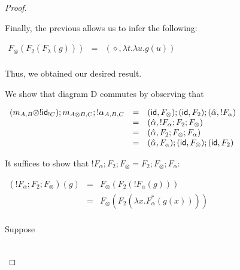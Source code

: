 \begin{proof}
\begin{report}
\begin{center}
\begin{itemize}
\begin{center}
      \end{center}
      Finally, the previous allows us to infer the following:
      \begin{center}
        \begin{math}
          \begin{array}{lll}
            F_\otimes(F_2(F_\lambda(g)))
            & = & (\diamond, \lambda t.\lambda u.g(u))\\
          \end{array}
        \end{math}
      \end{center}
      Thus, we obtained our desired result.

      \noindent
      We show that diagram D commutes by observing that
      \begin{center}
        \begin{math}
          \begin{array}{lll}
            (m_{A,B} \otimes !\mathsf{id}_{!C});m_{A\otimes B,C};!\alpha_{A,B,C}
            & = & (\mathsf{id},F_\otimes);(\mathsf{id},F_2);(\hat{\alpha},!F_\alpha)\\
            & = & (\hat{\alpha},!F_\alpha;F_2;F_\otimes)\\
            & = & (\hat{\alpha},F_2;F_\otimes;F_\alpha)\\
            & = & (\hat{\alpha},F_\alpha);(\mathsf{id},F_\otimes);(\mathsf{id},F_2)\\
          \end{array}
        \end{math}
      \end{center}
      It suffices to show that $!F_\alpha;F_2;F_\otimes = F_2;F_\otimes;F_\alpha$:
      \begin{center}
        \begin{math}
          \begin{array}{lll}
            (!F_\alpha;F_2;F_\otimes)(g)
            & = & F_\otimes(F_2(!F_\alpha(g)))\\
            & = & F_\otimes(F_2(\lambda x.F^*_\alpha(g(x))))\\
          \end{array}
        \end{math}
      \end{center}
      Suppose
      \begin{center}
        \vspace{-20px}
        \begin{math}
          \begin{array}{lll}

\end{array}
\end{math}
\end{center}
\end{itemize}
\end{center}
\end{report}
\end{proof}
